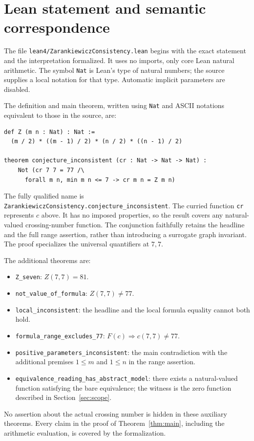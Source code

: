 \documentclass[11pt]{article}
\begin{document}
\section{Lean statement and semantic correspondence}
The file \texttt{lean4/ZarankiewiczConsistency.lean} begins with the exact
statement and the interpretation formalized. It uses no imports, only
core Lean natural arithmetic. The symbol \texttt{Nat} is Lean's type of
natural numbers; the source supplies a local notation for that type.
Automatic implicit parameters are disabled.

The definition and main theorem, written using \texttt{Nat} and ASCII
notations equivalent to those in the source, are:
\begin{verbatim}
def Z (m n : Nat) : Nat :=
  (m / 2) * ((m - 1) / 2) * (n / 2) * ((n - 1) / 2)

theorem conjecture_inconsistent (cr : Nat -> Nat -> Nat) :
    Not (cr 7 7 = 77 /\
      forall m n, min m n <= 7 -> cr m n = Z m n)
\end{verbatim}
The fully qualified name is
\texttt{ZarankiewiczConsistency.conjecture\_inconsistent}.
The curried function \texttt{cr} represents $c$ above. It has no imposed
properties, so the result covers any natural-valued crossing-number
function. The conjunction faithfully retains the headline and the full
range assertion, rather than introducing a surrogate graph invariant.
The proof specializes the universal quantifiers at $7,7$.

The additional theorems are:
\begin{itemize}
\item \texttt{Z\_seven}: $Z(7,7)=81$.
\item \texttt{not\_value\_of\_formula}: $Z(7,7)\ne77$.
\item \texttt{local\_inconsistent}: the headline and the local formula
equality cannot both hold.
\item \texttt{formula\_range\_excludes\_77}: $F(c)\Rightarrow c(7,7)\ne77$.
\item \texttt{positive\_parameters\_inconsistent}: the main contradiction
with the additional premises $1\leq m$ and $1\leq n$ in the range assertion.
\item \texttt{equivalence\_reading\_has\_abstract\_model}: there exists a
natural-valued function satisfying the bare equivalence; the witness is
the zero function described in Section~\ref{sec:scope}.
\end{itemize}
No assertion about the actual crossing number is hidden in these auxiliary
theorems. Every claim in the proof of Theorem~\ref{thm:main}, including
the arithmetic evaluation, is covered by the formalization.
\end{document}
